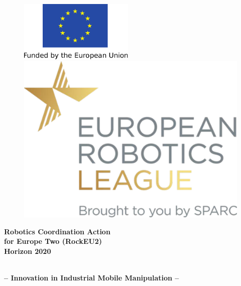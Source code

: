 
\thispagestyle{empty}

\begin{figure}
	\begin{minipage}{.4\textwidth}
		\flushright
		\vspace*{0.8cm}    
		\includegraphics[height=2.9cm]{./fig/logos/EU_flag.pdf}
	\end{minipage}%
	\begin{minipage}{.5\textwidth}
		\flushleft
		\hspace*{60pt}
		\includegraphics[scale=0.26]{./fig/logos/E-Robotics_league_logo.pdf}
	\end{minipage}
\end{figure}

\begin{center}
	\textbf{\large 
 		Robotics Coordination Action\\ 
 		for Europe Two (RockEU2)\\
 		Horizon 2020\\
	}
	
	\vspace*{10mm}
	\hrulefill
	\vspace*{5mm}

	\textbf{%
		{\Huge \erlirlong}\\[1.5ex]
		{\Large -- Innovation in Industrial Mobile Manipulation --}\\[1ex]
	}

	\hrulefill
	\vspace*{10mm}
\end{center}

